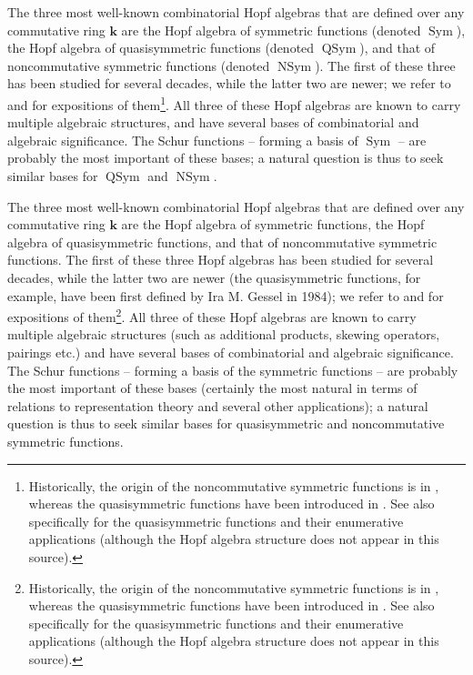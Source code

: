 \documentclass[numbers=enddot,12pt,final,onecolumn,notitlepage,abstracton]{scrartcl}%
\theoremstyle{definition}
\newenvironment{verlong}{}{}
\newenvironment{vershort}{}{}
\begin{document}
\begin{vershort}
The three most well-known combinatorial Hopf algebras that are defined over
any commutative ring $\mathbf{k}$ are the Hopf algebra of symmetric functions
(denoted $\operatorname*{Sym}$), the Hopf algebra of quasisymmetric functions
(denoted $\operatorname*{QSym}$), and that of noncommutative symmetric
functions (denoted $\operatorname*{NSym}$). The first of these three has been
studied for several decades, while the latter two are newer; we refer to
\cite[Chapters 4 and 6]{HGK} and \cite[Chapters 2 and 5]{Reiner} for
expositions of them\footnote{Historically, the origin of the noncommutative
symmetric functions is in \cite{NCSF1}, whereas the quasisymmetric functions
have been introduced in \cite{Gessel}. See also \cite[Section 7.19]%
{Stanley-EC2} specifically for the quasisymmetric functions and their
enumerative applications (although the Hopf algebra structure does not appear
in this source).}. All three of these Hopf algebras are known to carry
multiple algebraic structures, and have several bases of combinatorial and
algebraic significance. The Schur functions -- forming a basis of
$\operatorname*{Sym}$ -- are probably the most important of these bases; a
natural question is thus to seek similar bases for $\operatorname*{QSym}$ and
$\operatorname*{NSym}$.
\end{vershort}

\begin{verlong}
The three most well-known combinatorial Hopf algebras that are defined over
any commutative ring $\mathbf{k}$ are the Hopf algebra of symmetric functions,
the Hopf algebra of quasisymmetric functions, and that of noncommutative
symmetric functions. The first of these three Hopf algebras has been studied
for several decades, while the latter two are newer (the quasisymmetric
functions, for example, have been first defined by Ira M. Gessel in 1984); we
refer to \cite[Chapters 4 and 6]{HGK} and \cite[Chapters 2 and 5]{Reiner} for
expositions of them\footnote{Historically, the origin of the noncommutative
symmetric functions is in \cite{NCSF1}, whereas the quasisymmetric functions
have been introduced in \cite{Gessel}. See also \cite[Section 7.19]%
{Stanley-EC2} specifically for the quasisymmetric functions and their
enumerative applications (although the Hopf algebra structure does not appear
in this source).}. All three of these Hopf algebras are known to carry
multiple algebraic structures (such as additional products, skewing operators,
pairings etc.) and have several bases of combinatorial and algebraic
significance. The Schur functions -- forming a basis of the symmetric
functions -- are probably the most important of these bases (certainly the
most natural in terms of relations to representation theory and several other
applications); a natural question is thus to seek similar bases for
quasisymmetric and noncommutative symmetric functions.
\end{verlong}
\end{document}
